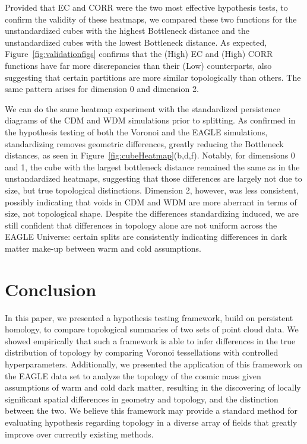\documentclass[12pt]{article}
\newcommand{\figref}[1]{Figure~\ref{#1}}
\begin{document}
Provided that EC and CORR were the two most effective hypothesis tests, to confirm the validity of these heatmaps, we compared these two functions for the unstandardized cubes with the highest Bottleneck distance and the unstandardized cubes with the lowest Bottleneck distance. As expected, \figref{fig:validationfigs} confirms that the (High) EC and (High) CORR functions have far more discrepancies than their (Low) counterparts, also suggesting that certain partitions are more similar topologically than others. The same pattern arises for dimension 0 and dimension 2.

We can do the same heatmap experiment with the standardized persistence diagrams of the CDM and WDM simulations prior to splitting. As confirmed in the hypothesis testing of both the Voronoi and the EAGLE simulations, standardizing removes geometric differences, greatly reducing the Bottleneck distances, as seen in \figref{fig:cubeHeatmap}(b,d,f). Notably, for dimensions 0 and 1, the cube with the largest bottleneck distance remained the same as in the unstandardized heatmaps, suggesting that those differences are largely not due to size, but true topological distinctions. Dimension 2, however, was less consistent, possibly indicating that voids in CDM and WDM are more aberrant in terms of size, not topological shape. Despite the differences standardizing induced, we are still confident that differences in topology alone are not uniform across the EAGLE Universe: certain splits are consistently indicating differences in dark matter make-up between warm and cold assumptions.


\section{Conclusion}
\label{sec:conc}
In this paper, we presented a hypothesis testing framework, build on persistent homology, to compare topological summaries of two sets of point cloud data. We showed empirically that such a framework is able to infer differences in the true distribution of topology by comparing Voronoi tessellations with controlled hyperparameters. Additionally, we presented the application of this framework on the EAGLE data set to analyze the topology of the cosmic mass given assumptions of warm and cold dark matter, resulting in the discovering of locally significant spatial differences in geometry and topology, and the distinction between the two. We believe this framework may provide a standard method for evaluating hypothesis regarding topology in a diverse array of fields that greatly improve over currently existing methods.
\end{document}
